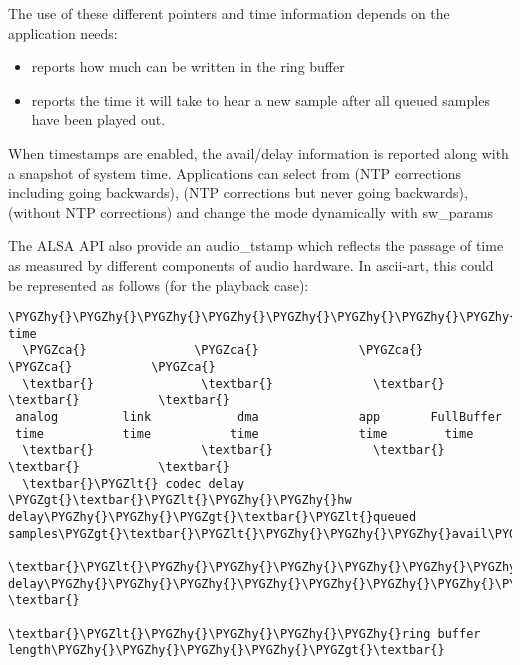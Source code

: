 \documentclass[a4paper,8pt,english]{sphinxmanual}
\def\PYGZca{\char`\^}
\def\PYGZlt{\char`\<}
\def\PYGZgt{\char`\>}
\def\PYGZhy{\char`\-}
\begin{document}
The use of these different pointers and time information depends on
the application needs:
\begin{itemize}
\item {} 
 reports how much can be written in the ring buffer

\item {} 
 reports the time it will take to hear a new sample after all
queued samples have been played out.

\end{itemize}

When timestamps are enabled, the avail/delay information is reported
along with a snapshot of system time. Applications can select from
 (NTP corrections including going backwards),
 (NTP corrections but never going backwards),
 (without NTP corrections) and change the mode
dynamically with sw\_params

The ALSA API also provide an audio\_tstamp which reflects the passage
of time as measured by different components of audio hardware.  In
ascii-art, this could be represented as follows (for the playback
case):

\begin{Verbatim}[commandchars=\\\{\}]
\PYGZhy{}\PYGZhy{}\PYGZhy{}\PYGZhy{}\PYGZhy{}\PYGZhy{}\PYGZhy{}\PYGZhy{}\PYGZhy{}\PYGZhy{}\PYGZhy{}\PYGZhy{}\PYGZhy{}\PYGZhy{}\PYGZhy{}\PYGZhy{}\PYGZhy{}\PYGZhy{}\PYGZhy{}\PYGZhy{}\PYGZhy{}\PYGZhy{}\PYGZhy{}\PYGZhy{}\PYGZhy{}\PYGZhy{}\PYGZhy{}\PYGZhy{}\PYGZhy{}\PYGZhy{}\PYGZhy{}\PYGZhy{}\PYGZhy{}\PYGZhy{}\PYGZhy{}\PYGZhy{}\PYGZhy{}\PYGZhy{}\PYGZhy{}\PYGZhy{}\PYGZhy{}\PYGZhy{}\PYGZhy{}\PYGZhy{}\PYGZhy{}\PYGZhy{}\PYGZhy{}\PYGZhy{}\PYGZhy{}\PYGZhy{}\PYGZhy{}\PYGZhy{}\PYGZhy{}\PYGZhy{}\PYGZhy{}\PYGZhy{}\PYGZhy{}\PYGZhy{}\PYGZhy{}\PYGZhy{}\PYGZhy{}\PYGZhy{}\PYGZgt{} time
  \PYGZca{}               \PYGZca{}              \PYGZca{}                \PYGZca{}           \PYGZca{}
  \textbar{}               \textbar{}              \textbar{}                \textbar{}           \textbar{}
 analog         link            dma              app       FullBuffer
 time           time           time              time        time
  \textbar{}               \textbar{}              \textbar{}                \textbar{}           \textbar{}
  \textbar{}\PYGZlt{} codec delay \PYGZgt{}\textbar{}\PYGZlt{}\PYGZhy{}\PYGZhy{}hw delay\PYGZhy{}\PYGZhy{}\PYGZgt{}\textbar{}\PYGZlt{}queued samples\PYGZgt{}\textbar{}\PYGZlt{}\PYGZhy{}\PYGZhy{}\PYGZhy{}avail\PYGZhy{}\PYGZgt{}\textbar{}
  \textbar{}\PYGZlt{}\PYGZhy{}\PYGZhy{}\PYGZhy{}\PYGZhy{}\PYGZhy{}\PYGZhy{}\PYGZhy{}\PYGZhy{}\PYGZhy{}\PYGZhy{}\PYGZhy{}\PYGZhy{}\PYGZhy{}\PYGZhy{}\PYGZhy{}\PYGZhy{}\PYGZhy{} delay\PYGZhy{}\PYGZhy{}\PYGZhy{}\PYGZhy{}\PYGZhy{}\PYGZhy{}\PYGZhy{}\PYGZhy{}\PYGZhy{}\PYGZhy{}\PYGZhy{}\PYGZhy{}\PYGZhy{}\PYGZhy{}\PYGZhy{}\PYGZhy{}\PYGZhy{}\PYGZhy{}\PYGZhy{}\PYGZhy{}\PYGZhy{}\PYGZhy{}\PYGZgt{}\textbar{}           \textbar{}
                                 \textbar{}\PYGZlt{}\PYGZhy{}\PYGZhy{}\PYGZhy{}\PYGZhy{}ring buffer length\PYGZhy{}\PYGZhy{}\PYGZhy{}\PYGZhy{}\PYGZgt{}\textbar{}
\end{Verbatim}
\end{document}
